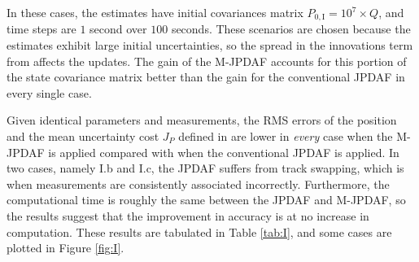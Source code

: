 In these cases, the estimates have initial covariances matrix $P_{0,\text{I}}=10^7\times Q$, and time steps are $1$ second over $100$ seconds.
These scenarios are chosen because the estimates exhibit large initial uncertainties, so the spread in the innovations term from  affects the updates.
The gain of the M-JPDAF accounts for this portion of the state covariance matrix better than the gain for the conventional JPDAF in every single case.

Given identical parameters and measurements, the RMS errors of the position and the mean uncertainty cost $J_P$ defined in  are lower in \emph{every} case when the M-JPDAF is applied compared with when the conventional JPDAF is applied.
In two cases, namely I.b and I.c, the JPDAF suffers from track swapping, which is when measurements are consistently associated incorrectly.
Furthermore, the computational time is roughly the same between the JPDAF and M-JPDAF, so the results suggest that the improvement in accuracy is at no increase in computation.
These results are tabulated in Table \ref{tab:I}, and some cases are plotted in Figure \ref{fig:I}.


